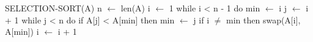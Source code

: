 \begin{pseudocode}[caption={Algoritmo de ordenação por seleção}, label={selectionSortP}]
SELECTION-SORT(A)
n $\gets$ len(A)
i $\gets$ 1
while i < n - 1 do
    min $\gets$ i
    j $\gets$ i + 1
    while j < n do
        if A[j] < A[min] then
            min $\gets$ j
    if i $\neq$ min then
        swap(A[i], A[min])
    i $\gets$ i + 1
\end{pseudocode}